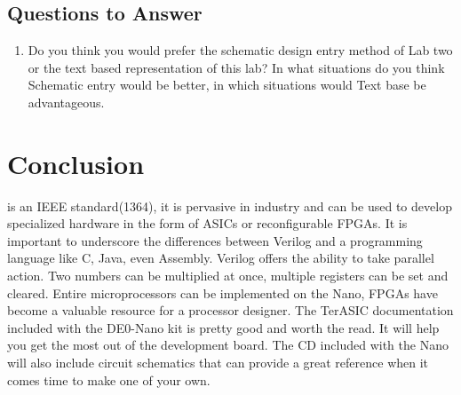     \subsection{Questions to Answer}
      \begin{enumerate}
        \item Do you think you would prefer the schematic design entry method of Lab two or the text based representation of this lab? In what situations do you think Schematic entry would be better, in which situations would Text base be advantageous.
      \end{enumerate}

  \section{Conclusion}
     is an IEEE standard(1364)\cite{Wikipedia:Verilog}, it is pervasive in industry and can be used to develop specialized hardware in the form of ASICs or reconfigurable FPGAs. It is important to underscore the differences between Verilog and a programming language like C, Java, even Assembly. Verilog offers the ability to take parallel action. Two numbers can be multiplied at once, multiple registers can be set and cleared. Entire microprocessors can be implemented on the Nano, FPGAs have become a valuable resource for a processor designer. The TerASIC documentation included with the DE0-Nano kit is pretty good and worth the read. It will help you get the most out of the development board. The CD included with the Nano will also include circuit schematics that can provide a great reference when it comes time to make one of your own.

  

